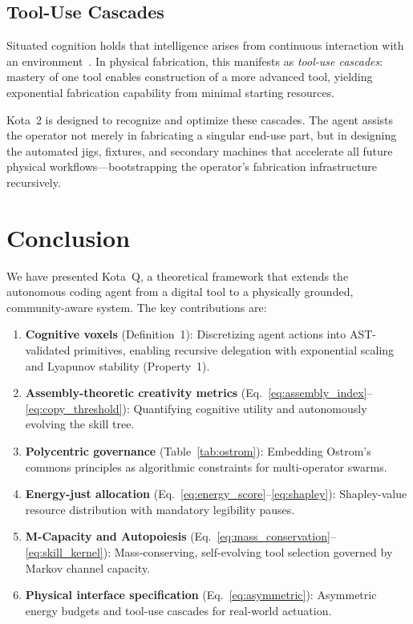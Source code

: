 \documentclass[11pt,a4paper]{article}
\begin{document}
\subsection{Tool-Use Cascades}

Situated cognition holds that intelligence arises from continuous interaction with an environment~\citep{suchman1987plans}. In physical fabrication, this manifests as \emph{tool-use cascades}: mastery of one tool enables construction of a more advanced tool, yielding exponential fabrication capability from minimal starting resources.

Kota~2 is designed to recognize and optimize these cascades. The agent assists the operator not merely in fabricating a singular end-use part, but in designing the automated jigs, fixtures, and secondary machines that accelerate all future physical workflows---bootstrapping the operator's fabrication infrastructure recursively.

\section{Conclusion}
\label{sec:conclusion}

We have presented Kota~Q, a theoretical framework that extends the autonomous coding agent from a digital tool to a physically grounded, community-aware system. The key contributions are:

\begin{enumerate}
    \item \textbf{Cognitive voxels} (Definition~1): Discretizing agent actions into AST-validated primitives, enabling recursive delegation with exponential scaling and Lyapunov stability (Property~1).
    \item \textbf{Assembly-theoretic creativity metrics} (Eq.~\ref{eq:assembly_index}--\ref{eq:copy_threshold}): Quantifying cognitive utility and autonomously evolving the skill tree.
    \item \textbf{Polycentric governance} (Table~\ref{tab:ostrom}): Embedding Ostrom's commons principles as algorithmic constraints for multi-operator swarms.
    \item \textbf{Energy-just allocation} (Eq.~\ref{eq:energy_score}--\ref{eq:shapley}): Shapley-value resource distribution with mandatory legibility pauses.
    \item \textbf{M-Capacity and Autopoiesis} (Eq.~\ref{eq:mass_conservation}--\ref{eq:skill_kernel}): Mass-conserving, self-evolving tool selection governed by Markov channel capacity.
    \item \textbf{Physical interface specification} (Eq.~\ref{eq:asymmetric}): Asymmetric energy budgets and tool-use cascades for real-world actuation.
\end{enumerate}
\end{document}
